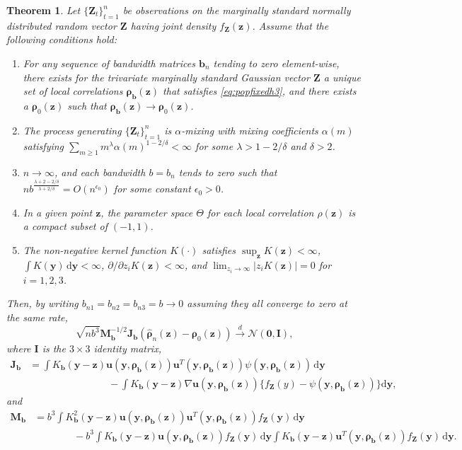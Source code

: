 \documentclass[
  12pt,
  letterpaper]{article}
\providecommand{\tightlist}{%
  \setlength{\itemsep}{0pt}\setlength{\parskip}{0pt}}
\newcommand{\Z}{\bm{Z}}
\newcommand{\z}{\bm{z}}
\newcommand{\y}{\bm{y}}
\newcommand{\fu}{\bm{u}}
\newcommand{\frho}{\bm{\rho}}
\newcommand{\hfrho}{\widehat{\bm{\rho}}}
\newcommand{\hh}{\bm{b}}
\newcommand{\Jb}{\bm{J}_{\hh}}
\newcommand{\Mb}{\bm{M}_{\hh}}
\newtheorem{theorem}{Theorem}[section]
\theoremstyle{definition}
\theoremstyle{definition}
\theoremstyle{definition}
\theoremstyle{remark}
\begin{document}
\begin{theorem}
\protect\hypertarget{thm:loccor3}{}{\label{thm:loccor3} }Let \(\{\Z_t\}_{t=1}^n\) be observations on the marginally standard normally distributed random vector \(\Z\) having joint density \(f_{\Z}(\z)\). Assume that the following conditions hold:

\begin{enumerate}
\def\labelenumi{\arabic{enumi}.}
\tightlist
\item
  For any sequence of bandwidth matrices \(\hh_n\) tending to zero element-wise, there exists for the trivariate marginally standard Gaussian vector \(\Z\) a unique set of local correlations \(\frho_{\hh}(\z)\) that satisfies \eqref{eq:popfixedh3}, and there exists a \(\frho_0(\z)\) such that \(\frho_{\hh}(\z) \rightarrow \frho_0(\z)\).
\item
  The process generating \(\{\Z_t\}_{t=1}^n\) is \(\alpha\)-mixing with mixing coefficients \(\alpha(m)\) satisfying \(\sum_{m\geq1}m^{\lambda}\alpha(m)^{1-2/\delta} < \infty\) for some \(\lambda > 1-2/\delta\) and \(\delta>2\).
\item
  \(n\rightarrow\infty\), and each bandwidth \(b = b_n\) tends to zero such that \(nb^{\frac{\lambda+2-2/\delta}{\lambda + 2/\delta}} = O(n^{\epsilon_0})\) for some constant \(\epsilon_0 > 0\).
\item
  In a given point \(\z\), the parameter space \(\Theta\) for each local correlation \(\rho(\z)\) is a compact subset of \((-1,1)\).
\item
  The non-negative kernel function \(K(\cdot)\) satisfies \(\sup_{\z}K(\z) < \infty\), \(\int K(\y)\,\textrm{d}\y < \infty\), \(\partial/\partial z_iK(\z) <\infty\), and \(\lim_{z_i \rightarrow \infty}|z_iK(\z)| = 0\) for \(i = 1,2,3\).
\end{enumerate}

Then, by writing \(b_{n1} = b_{n2} = b_{n3} = b \rightarrow 0\) assuming they all converge to zero at the same rate,
\begin{equation}
\sqrt{nb^3}\Mb^{-1/2}\Jb\left(\hfrho_n(\z) - \frho_0(\z)\right) \stackrel{d}{\rightarrow} \mathcal{N}(\bm{0}, \bm{I}),
\label{eq:an3}
\end{equation}
where \(\bm{I}\) is the \(3\times3\) identity matrix,
\begin{align*}
\Jb &= \int K_{\hh}(\y - \z)\fu(\y, \frho_{\hh}(\z))\fu^T(\y, \frho_{\hh}(\z))\psi(\y,\frho_{\hh}(\z))\,\textrm{d}\y \\
& \qquad\qquad\qquad\qquad - \int K_{\hh}(\y - \z)\nabla\fu(\y,\frho_{\hh}(\z))\Big\{f_{\Z}(y) - \psi(\y,\frho_{\hh}(\z))\Big\}\textrm{d}\y,
\end{align*}
and
\begin{align*}
\Mb &= b^3\int K^2_{\hh}(\y - \z)\fu(\y, \frho_{\hh}(\z))\fu^T(\y,\frho_{\hh}(\z))f_{\Z}(\y)\,\textrm{d}\y \\
& \qquad\qquad - b^3\int K_{\hh}(\y - \z)\fu(\y, \frho_{\hh}(\z))f_{\Z}(\y)\,\textrm{d}\y \int K_{\hh}(\y - \z)\fu^T(\y, \frho_{\hh}(\z))f_{\Z}(\y)\,\textrm{d}\y.
\end{align*}
\end{theorem}
\end{document}
